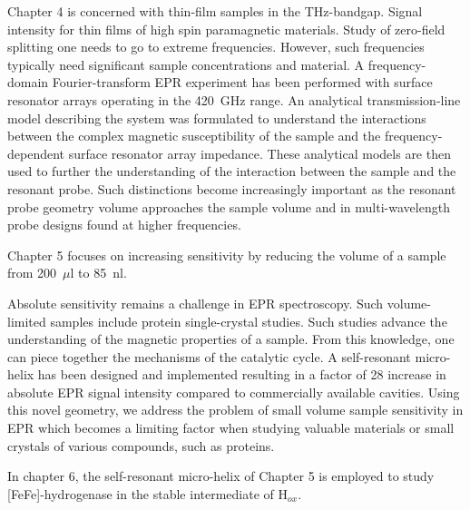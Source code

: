 Chapter 4 is concerned with thin-film samples in the THz-bandgap. Signal intensity for thin films of high spin paramagnetic materials. Study of zero-field splitting one needs to go to extreme frequencies. However, such frequencies typically need significant sample concentrations and material. A frequency-domain Fourier-transform EPR experiment has been performed with surface resonator arrays operating in the 420~GHz range. An analytical transmission-line model describing the system was formulated to understand the interactions between the complex magnetic susceptibility of the sample and the frequency-dependent surface resonator array impedance. These analytical models are then used to further the understanding of the interaction between the sample and the resonant probe. Such distinctions become increasingly important as the resonant probe geometry volume approaches the sample volume and in multi-wavelength probe designs found at higher frequencies. 

Chapter 5 focuses on increasing sensitivity by reducing the volume of a sample from 200~$\mu$l to 85~nl.

Absolute sensitivity remains a challenge in EPR spectroscopy. Such volume-limited samples include protein single-crystal studies. Such studies advance the understanding of the magnetic properties of a sample. From this knowledge, one can piece together the mechanisms of the catalytic cycle. A self-resonant micro-helix has been designed and implemented resulting in a factor of 28 increase in absolute EPR signal intensity compared to commercially available cavities. Using this novel geometry, we address the problem of small volume sample sensitivity in EPR which becomes a limiting factor when studying valuable materials or small crystals of various compounds, such as proteins. 

In chapter 6, the self-resonant micro-helix of Chapter 5 is employed to study [FeFe]-hydrogenase in the stable intermediate of H$_{ox}$. 







{\renewcommand{\bibsection}{\clearpage\section*{\bibname}\markboth{\bibname}{\bibname}}
\renewcommand{\bibname}{CHAPTER 1. REFERENCES}


}